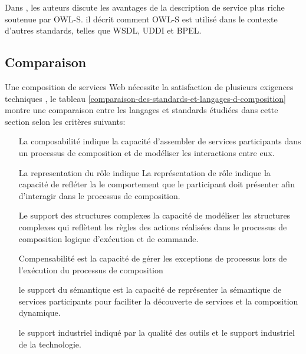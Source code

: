     Dans \cite{martin2004owl}, les auteurs discute les avantages de la
    description de service plus riche soutenue par \textsc{OWL-S}. il
    décrit comment \textsc{OWL-S} est utilisé dans le contexte
    d'autres standards, telles que \textsc{WSDL}, \textsc{UDDI} et
    \textsc{BPEL}.
    \subsection{Comparaison}
    \label{sec:langs-comparaison}

    Une composition de services Web nécessite la satisfaction de
    plusieurs exigences techniques \cite{sheng2014web,
      bucchiarone2006survey} , le tableau
    \ref{comparaison-des-standards-et-langages-d-composition} montre
    une comparaison entre les langages et standards étudiées dans
    cette section selon les critères suivants:

    

    \SpecialItem
    \begin{itemize}
      \item [La composabilité] indique la capacité
        d'assembler de services participants dans un processus de
        composition et de modéliser les interactions entre eux.

      \item [La representation du rôle] indique La représentation de
        rôle indique la capacité de refléter la le comportement que le
        participant doit présenter afin d'interagir dans le processus
        de composition.

      \item [Le support des structures complexes] la capacité de
        modéliser les structures complexes qui reflètent les règles
        des actions réalisées dans le processus de composition logique
        d'exécution et de commande.

      \item [Compensabilité] est la capacité de gérer les
        exceptions de processus lors de l'exécution du processus de
        composition

      \item [le support du sémantique] est la capacité de représenter
        la sémantique de services participants pour faciliter la
        découverte de services et la composition dynamique.

      \item [le support industriel] indiqué par la qualité des outils
        et le support industriel de la technologie.
    \end{itemize}

